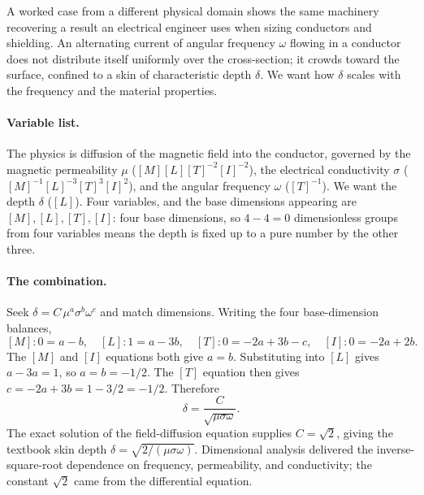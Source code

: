 A worked case from a different physical domain shows the same
machinery recovering a result an electrical engineer uses when sizing
conductors and shielding. An alternating current of angular frequency
$\omega$ flowing in a conductor does not distribute itself uniformly
over the cross-section; it crowds toward the surface, confined to a
skin of characteristic depth $\delta$. We want how $\delta$ scales
with the frequency and the material properties.

\paragraph{Variable list.} The physics is diffusion of the magnetic
field into the conductor, governed by the magnetic permeability $\mu$
($[M][L][T]^{-2}[I]^{-2}$), the electrical conductivity $\sigma$
($[M]^{-1}[L]^{-3}[T]^{3}[I]^{2}$), and the angular frequency $\omega$
($[T]^{-1}$). We want the depth $\delta$ ($[L]$). Four variables, and
the base dimensions appearing are $[M], [L], [T], [I]$: four base
dimensions, so $4 - 4 = 0$ dimensionless groups from four variables
means the depth is fixed up to a pure number by the other three.

\paragraph{The combination.} Seek $\delta = C\, \mu^{a} \sigma^{b}
\omega^{c}$ and match dimensions. Writing the four base-dimension
balances,
\[
[M]: 0 = a - b, \quad
[L]: 1 = a - 3b, \quad
[T]: 0 = -2a + 3b - c, \quad
[I]: 0 = -2a + 2b.
\]
The $[M]$ and $[I]$ equations both give $a = b$. Substituting into
$[L]$ gives $a - 3a = 1$, so $a = b = -1/2$. The $[T]$ equation then
gives $c = -2a + 3b = 1 - 3/2 = -1/2$. Therefore
\[
\delta = \frac{C}{\sqrt{\mu \sigma \omega}}.
\]
The exact solution of the field-diffusion equation supplies
$C = \sqrt{2}$, giving the textbook skin depth $\delta = \sqrt{2/
(\mu \sigma \omega)}$. Dimensional analysis delivered the
inverse-square-root dependence on frequency, permeability, and
conductivity; the constant $\sqrt{2}$ came from the differential
equation.

